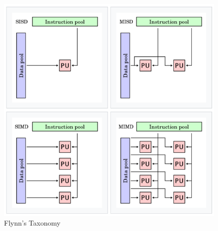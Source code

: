\documentclass{article}
\begin{document}
\begin{figure}[!t]
    \centering
    \includegraphics[scale=0.5]{flynn.png}
    \caption{Flynn's Taxonomy}
    \label{fig:my_label}
\end{figure}
\end{document}
